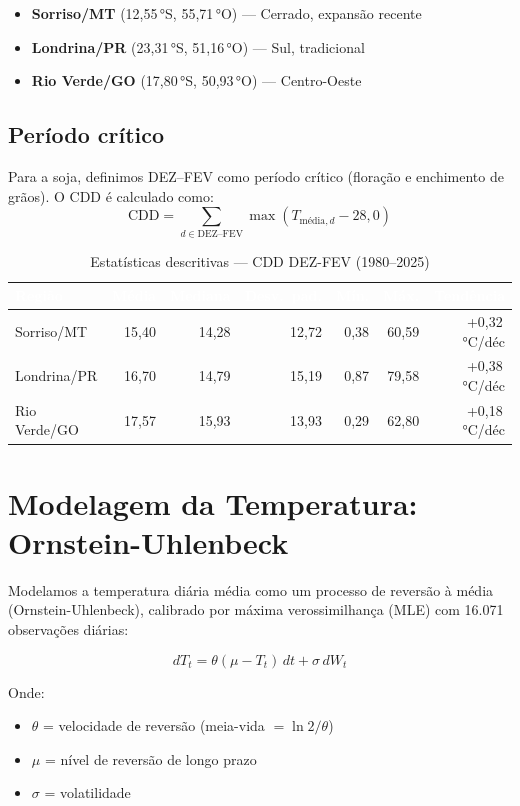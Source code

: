 \documentclass[11pt,a4paper]{article}
\newcommand{\destaque}[1]{\textcolor{wolf_blue}{\textbf{#1}}}
\begin{document}
\begin{itemize}
  \item \destaque{Sorriso/MT} (12,55\,°S, 55,71\,°O) --- Cerrado, expansão recente
  \item \destaque{Londrina/PR} (23,31\,°S, 51,16\,°O) --- Sul, tradicional
  \item \destaque{Rio Verde/GO} (17,80\,°S, 50,93\,°O) --- Centro-Oeste
\end{itemize}

\subsection*{Período crítico}
Para a soja, definimos DEZ--FEV como período crítico (floração e enchimento
de grãos). O CDD é calculado como:
\[
\text{CDD} = \sum_{d\in\text{DEZ--FEV}} \max(T_{\text{média},d} - 28, 0)
\]

\begin{table}[htbp]
\centering
\caption{Estatísticas descritivas --- CDD DEZ-FEV (1980--2025)}
\label{tab:descritivas}
\small
\begin{tabular}{lrrrrrr}
\toprule
\rowcolor{wolf_blue}\textcolor{white}{\textbf{Região}} &
\textcolor{white}{\textbf{Média}} &
\textcolor{white}{\textbf{Mediana}} &
\textcolor{white}{\textbf{Desv.\ pad.}} &
\textcolor{white}{\textbf{Mín.}} &
\textcolor{white}{\textbf{Máx.}} &
\textcolor{white}{\textbf{Tendência}} \\
\midrule
Sorriso/MT   & 15,40 & 14,28 & 12,72 & 0,38 & 60,59 & +0,32\,°C/déc \\
Londrina/PR  & 16,70 & 14,79 & 15,19 & 0,87 & 79,58 & +0,38\,°C/déc \\
Rio Verde/GO & 17,57 & 15,93 & 13,93 & 0,29 & 62,80 & +0,18\,°C/déc \\
\bottomrule
\end{tabular}
\end{table}

\section{Modelagem da Temperatura: Ornstein-Uhlenbeck}

Modelamos a temperatura diária média como um processo de reversão à média
(Ornstein-Uhlenbeck), calibrado por máxima verossimilhança (MLE) com 16.071
observações diárias:

\[
dT_t = \theta(\mu - T_t)\,dt + \sigma\,dW_t
\]

Onde:
\begin{itemize}
  \item $\theta$ = velocidade de reversão (meia-vida $= \ln 2 / \theta$)
  \item $\mu$ = nível de reversão de longo prazo
  \item $\sigma$ = volatilidade
\end{itemize}
\end{document}
